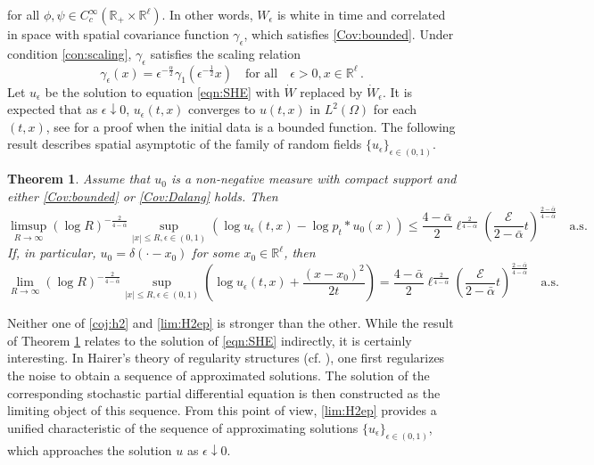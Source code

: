 \documentclass[12pt,reqno]{amsart}
\newtheorem{theorem}{Theorem}[section]
\theoremstyle{remark}
\newcommand{\1}{\mathbf{1}}
\def\RR{\mathbb{R}}
\def\cee{{\mathcal E}}
\def\lt{\left}
\def\rt{\right}
\begin{document}
	for all  $\phi,\psi\in C_c^{\infty}(\RR_+\times\RR^\ell)$.
	In other words, $W_ \epsilon$ is white in time and correlated in space with spatial covariance function $\gamma_ \epsilon$, which satisfies \ref{Cov:bounded}. Under condition \ref{con:scaling}, $\gamma_ \epsilon$ satisfies the scaling relation
	\begin{equation}\label{eqn:scalgamma}
			\gamma_ \epsilon(x)=\epsilon^{-\frac \alpha2}\gamma_1(\epsilon^{-\frac12} x)\quad \mbox{for all}\quad \epsilon>0,x\in\RR^\ell\,.
	\end{equation}
	Let $u_ \epsilon$ be the solution to equation \eqref{eqn:SHE} with $\dot{W}$ replaced by $\dot{W}_ \epsilon$. 
 It is expected that as $\epsilon\downarrow0$, $u_ \epsilon(t,x)$ converges to $u(t,x)$ in $L^2(\Omega)$ for each $(t,x)$, see \cite{ChenHuang} for a proof when the initial data is a bounded function. The following result describes spatial asymptotic of the family of random fields $\{u_\epsilon\}_{\epsilon\in(0,1)}$.
	\begin{theorem}\label{thm:uep}
	Assume that $u_0$ is a non-negative measure with compact support and either \ref{Cov:bounded} or \ref{Cov:Dalang} holds. Then
		\begin{equation}\label{lim:H2epup}
			\limsup_{R\to\infty}(\log R)^{-\frac2{4- \bar{\alpha}}}\sup_{|x|\le R,\epsilon\in(0,1)}\lt(\log u_ \epsilon(t,x)-\log p_t*u_0(x) \rt)
			\leq\frac{4- \bar{\alpha}}2\ell^{\frac2{4- \bar{\alpha}}} \lt(\frac{\cee}{2- \bar{\alpha}}t \rt)^{\frac{2- \bar{\alpha}}{4- \bar{\alpha}}}\quad \mathrm{a.s.}
		\end{equation} 
		If, in particular, $u_0=\delta(\cdot-x_0)$ for some $x_0 \in \RR^{\ell}$, then
		\begin{equation}\label{lim:H2ep}
			\lim_{R\to\infty}(\log R)^{-\frac2{4- \bar{\alpha}}}\sup_{|x|\le R,\epsilon\in(0,1)}\lt(\log u_ \epsilon(t,x) + \frac{(x-x_0)^2}{2t} \rt)
			=\frac{4- \bar{\alpha}}2\ell^{\frac2{4- \bar{\alpha}}} \lt(\frac{\cee}{2- \bar{\alpha}}t \rt)^{\frac{2- \bar{\alpha}}{4- \bar{\alpha}}}\quad \mathrm{a.s.}
		\end{equation} 		
	\end{theorem}
	Neither one of \eqref{coj:h2} and \eqref{lim:H2ep} is stronger than the other. While the result of Theorem \ref{thm:uep} relates to the solution of \eqref{eqn:SHE} indirectly, it is certainly interesting. In Hairer's theory of regularity structures (cf. \cite{MR3274562}), one first regularizes the noise to obtain a sequence of approximated solutions. The solution of the corresponding stochastic partial differential equation is then constructed as the limiting object of this sequence. From this point of view, \eqref{lim:H2ep} provides a unified characteristic of the sequence of approximating solutions $\{u_ \epsilon\}_{\epsilon\in(0,1)}$, which approaches the solution $u$ as $\epsilon\downarrow 0$. 
\end{document}
